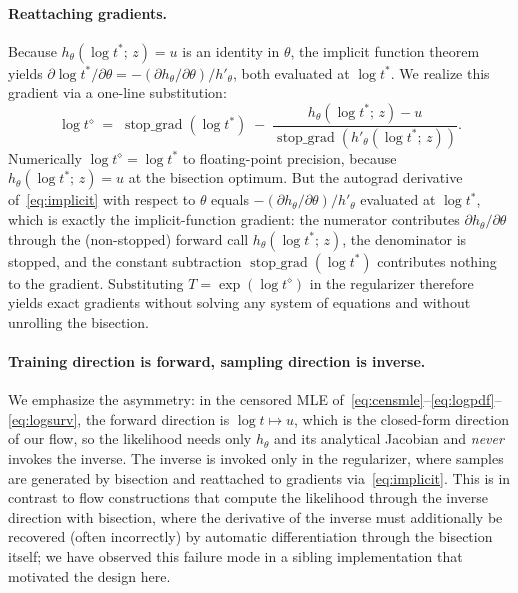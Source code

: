 \paragraph{Reattaching gradients.}
Because $h_\theta(\log t^{*};\, z) = u$ is an identity in $\theta$, the
implicit function theorem yields
$\partial \log t^{*} / \partial \theta
 = -(\partial h_\theta / \partial \theta) / h'_\theta$,
both evaluated at $\log t^{*}$. We realize this gradient via a one-line
substitution:
\begin{equation}
    \log t^{\diamond}
    \;=\;
    \operatorname{stop\_grad}(\log t^{*})
    \;-\;
    \frac{
        h_\theta\!\left(\log t^{*};\, z\right) - u
    }{
        \operatorname{stop\_grad}\!\left(h'_\theta(\log t^{*};\, z)\right)
    }.
    \label{eq:implicit}
\end{equation}
Numerically $\log t^{\diamond} = \log t^{*}$ to floating-point precision,
because $h_\theta(\log t^{*};\, z) = u$ at the bisection optimum. But the
autograd derivative of~\eqref{eq:implicit} with respect to $\theta$ equals
$-(\partial h_\theta / \partial \theta) / h'_\theta$ evaluated at
$\log t^{*}$, which is exactly the implicit-function gradient: the numerator
contributes $\partial h_\theta / \partial \theta$ through the (non-stopped)
forward call $h_\theta(\log t^{*};\, z)$, the denominator is stopped, and the
constant subtraction $\operatorname{stop\_grad}(\log t^{*})$ contributes
nothing to the gradient. Substituting $T = \exp(\log t^{\diamond})$ in the
regularizer therefore yields exact gradients without solving any system of
equations and without unrolling the bisection.

\paragraph{Training direction is forward, sampling direction is inverse.}
We emphasize the asymmetry: in the censored MLE
of~\eqref{eq:censmle}--\eqref{eq:logpdf}--\eqref{eq:logsurv}, the forward
direction is $\log t \mapsto u$, which is the closed-form direction of our
flow, so the likelihood needs only $h_\theta$ and its analytical Jacobian and
\emph{never} invokes the inverse. The inverse is invoked only in the
regularizer, where samples are generated by bisection and reattached to
gradients via~\eqref{eq:implicit}. This is in contrast to flow constructions
that compute the likelihood through the inverse direction with bisection,
where the derivative of the inverse must additionally be recovered (often
incorrectly) by automatic differentiation through the bisection itself; we
have observed this failure mode in a sibling implementation that motivated
the design here.

